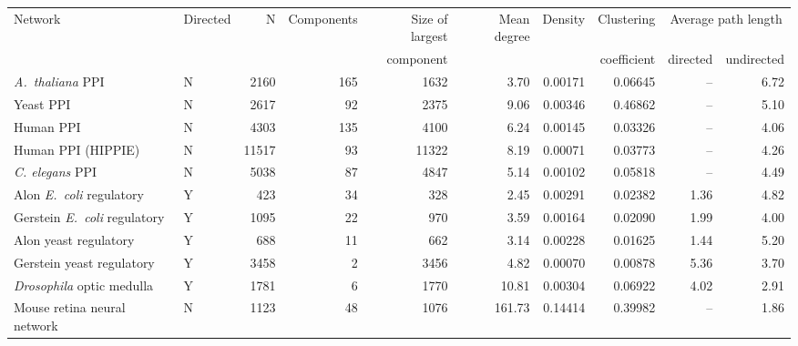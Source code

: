 \begin{tabular}{llrrrrrrrr}
\hline
Network & Directed & N  &   Components &  Size of largest &Mean degree     &    Density & Clustering  & \multicolumn{2}{c}{Average path length}\\
        &          &    &              &  component       &                &            &  coefficient & directed & undirected \\
\hline
\textit{A.~thaliana} PPI & N & 2160 & 165 & 1632 & 3.70 & 0.00171 & 0.06645 & -- & 6.72\\
Yeast PPI & N & 2617 & 92 & 2375 & 9.06 & 0.00346 & 0.46862 & -- & 5.10\\
Human PPI & N & 4303 & 135 & 4100 & 6.24 & 0.00145 & 0.03326 & -- & 4.06\\
Human PPI (HIPPIE) & N & 11517 & 93 & 11322 & 8.19 & 0.00071 & 0.03773 & -- & 4.26\\
\textit{C. elegans} PPI & N & 5038 & 87 & 4847 & 5.14 & 0.00102 & 0.05818 & -- & 4.49\\
Alon \textit{E.~coli} regulatory & Y & 423 & 34 & 328 & 2.45 & 0.00291 & 0.02382 & 1.36 & 4.82\\
Gerstein \textit{E.~coli} regulatory & Y & 1095 & 22 & 970 & 3.59 & 0.00164 & 0.02090 & 1.99 & 4.00\\
Alon yeast regulatory & Y & 688 & 11 & 662 & 3.14 & 0.00228 & 0.01625 & 1.44 & 5.20\\
Gerstein yeast regulatory & Y & 3458 & 2 & 3456 & 4.82 & 0.00070 & 0.00878 & 5.36 & 3.70\\
\textit{Drosophila} optic medulla & Y & 1781 & 6 & 1770 & 10.81 & 0.00304 & 0.06922 & 4.02 & 2.91\\
Mouse retina neural network & N & 1123 & 48 & 1076 & 161.73 & 0.14414 & 0.39982 & -- & 1.86\\
\hline
\end{tabular}
